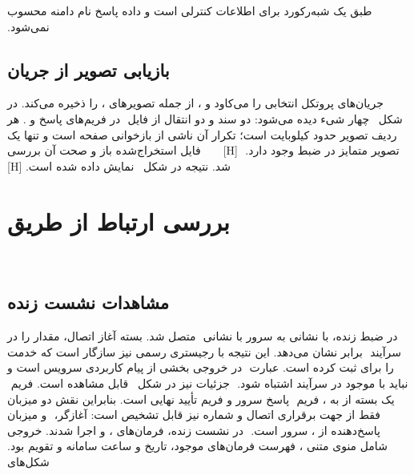 ‫طبق  یک شبه‌رکورد  برای اطلاعات کنترلی است و داده پاسخ نام دامنه محسوب
‫نمی‌شود.
‫
‫\subsection{بازیابی تصویر از جریان }
‫
‫
‫جریان‌های پروتکل انتخابی را می‌کاود و
‫، از جمله تصویرهای ، را ذخیره می‌کند.
‫در شکل~ چهار شیء دیده می‌شود: دو سند  و دو انتقال از فایل
‫ در فریم‌های پاسخ  و . هر ردیف تصویر حدود  کیلوبایت است؛ تکرار
‫آن ناشی از بازخوانی صفحه است و تنها یک تصویر متمایز در ضبط وجود دارد.
‫
‫[H]
‫
‫
‫
‫
‫
‫فایل استخراج‌شده باز و صحت آن بررسی شد. نتیجه در
‫شکل~ نمایش داده شده است.
‫
‫[H]
‫
‫
‫
‫
‫
‫\section{بررسی ارتباط از طریق }
‫
‫\subsection{مشاهدات نشست زنده }
‫
‫در ضبط زنده،  با نشانی  به سرور  با نشانی
‫ متصل شد. بسته آغاز اتصال، مقدار  را در سرآیند
‫ برابر  نشان می‌دهد. این نتیجه با رجیستری رسمی  نیز سازگار است که
‫خدمت  را برای  ثبت کرده است. عبارت
‫ در خروجی  بخشی از پیام کاربردی سرویس
‫است و نباید با  موجود در سرآیند  اشتباه شود.
‫
‫جزئیات  نیز در
‫شکل~ قابل مشاهده است. فریم
‫ یک بسته  از  به ، فریم
‫ پاسخ  سرور و فریم  تأیید نهایی  است. بنابراین
‫نقش دو میزبان فقط از جهت برقراری اتصال و شماره  نیز قابل تشخیص است: آغازگر،
‫ و میزبان پاسخ‌دهنده از ، سرور است.
‫
‫در نشست زنده، فرمان‌های ،  و  اجرا شدند. خروجی شامل منوی متنی
‫، فهرست فرمان‌های موجود، تاریخ و ساعت سامانه و تقویم بود. شکل‌های
